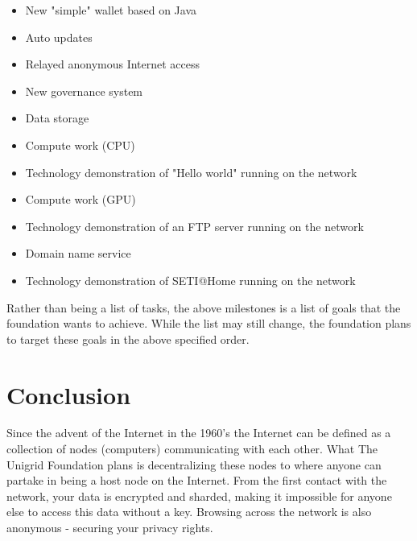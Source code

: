\documentclass{article}
\begin{document}
\begin{itemize}
  \item New "simple" wallet based on Java
  \item Auto updates
  \item Relayed anonymous Internet access
  \item New governance system
  \item Data storage
  \item Compute work (CPU)
  \item Technology demonstration of "Hello world" running on the network
  \item Compute work (GPU)
  \item Technology demonstration of an FTP server running on the network
  \item Domain name service
  \item Technology demonstration of SETI@Home running on the network
\end{itemize}

\noindent Rather than being a list of tasks, the above milestones is a list of goals that the foundation wants to achieve. While the list may still change, the foundation plans to target these goals in the above specified order.

\section{Conclusion}
Since the advent of the Internet in the 1960's \cite{int1997} the Internet can be defined as a collection of nodes (computers) communicating with each other. What The Unigrid Foundation plans is decentralizing these nodes to where anyone can partake in being a host node on the Internet. From the first contact with the network, your data is encrypted and sharded, making it impossible for anyone else to access this data without a key. Browsing across the network is also anonymous - securing your privacy rights.
\end{document}
